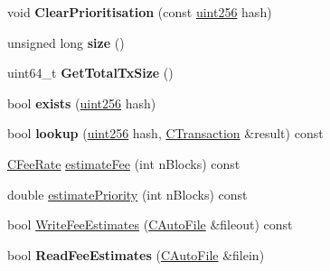 \begin{DoxyCompactItemize}
void {\bfseries Clear\+Prioritisation} (const \mbox{\hyperlink{classuint256}{uint256}} hash)
\item 
\mbox{\label{class_c_tx_mem_pool_a867f7b452141770f3b2e8697fb3513d8}} 
unsigned long {\bfseries size} ()
\item 
\mbox{\label{class_c_tx_mem_pool_ad388f6544c2ca90f1550b06d9d86d54f}} 
uint64\+\_\+t {\bfseries Get\+Total\+Tx\+Size} ()
\item 
\mbox{\label{class_c_tx_mem_pool_adba06e79be4a1a092dd2db8290733be7}} 
bool {\bfseries exists} (\mbox{\hyperlink{classuint256}{uint256}} hash)
\item 
\mbox{\label{class_c_tx_mem_pool_ad6d9966cdeb4b6586f7186e709b4e77e}} 
bool {\bfseries lookup} (\mbox{\hyperlink{classuint256}{uint256}} hash, \mbox{\hyperlink{class_c_transaction}{C\+Transaction}} \&result) const
\item 
\mbox{\hyperlink{class_c_fee_rate}{C\+Fee\+Rate}} \mbox{\hyperlink{class_c_tx_mem_pool_a32dd66c128330aed86865c8a61857c6c}{estimate\+Fee}} (int n\+Blocks) const
\item 
double \mbox{\hyperlink{class_c_tx_mem_pool_a225378304025c093d2dc5fcb754ade3b}{estimate\+Priority}} (int n\+Blocks) const
\item 
bool \mbox{\hyperlink{class_c_tx_mem_pool_a251f595b6527be005634574ce5d01f70}{Write\+Fee\+Estimates}} (\mbox{\hyperlink{class_c_auto_file}{C\+Auto\+File}} \&fileout) const
\item 
\mbox{\label{class_c_tx_mem_pool_a0dbbcb6a3b7e1a6c564410668c12cd4f}} 
bool {\bfseries Read\+Fee\+Estimates} (\mbox{\hyperlink{class_c_auto_file}{C\+Auto\+File}} \&filein)
\end{DoxyCompactItemize}
